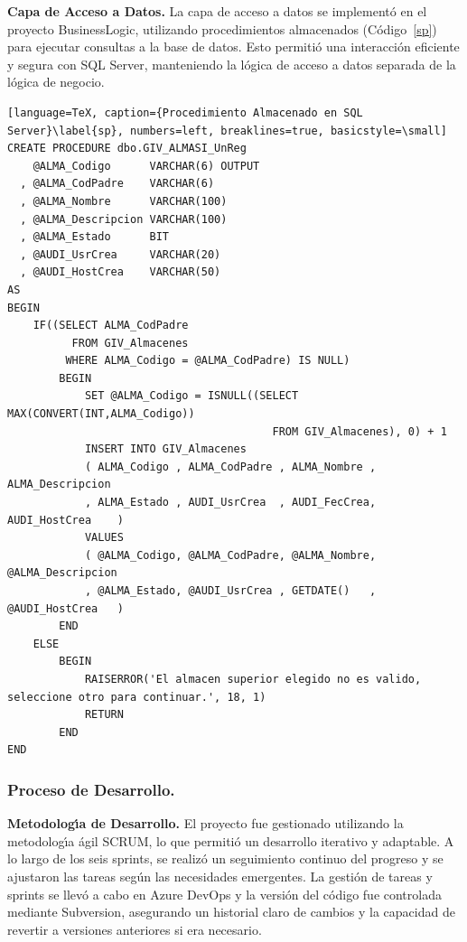 \documentclass[stu, 12pt, letterpaper, donotrepeattitle, floatsintext, natbib]{apa7}
\begin{document}
\textbf{Capa de Acceso a Datos. }La capa de acceso a datos se implement\'o en el proyecto BusinessLogic, utilizando procedimientos almacenados (C\'odigo~\ref{sp}) para ejecutar consultas a la base de datos. Esto permiti\'o una interacci\'on eficiente y segura con SQL Server, manteniendo la l\'ogica de acceso a datos separada de la l\'ogica de negocio.
\begin{lstlisting}[language=TeX, caption={Procedimiento Almacenado en SQL Server}\label{sp}, numbers=left, breaklines=true, basicstyle=\small]
CREATE PROCEDURE dbo.GIV_ALMASI_UnReg 
    @ALMA_Codigo      VARCHAR(6) OUTPUT
  , @ALMA_CodPadre    VARCHAR(6)
  , @ALMA_Nombre      VARCHAR(100)
  , @ALMA_Descripcion VARCHAR(100)
  , @ALMA_Estado      BIT
  , @AUDI_UsrCrea     VARCHAR(20)
  , @AUDI_HostCrea    VARCHAR(50)  
AS  
BEGIN
    IF((SELECT ALMA_CodPadre 
          FROM GIV_Almacenes  
         WHERE ALMA_Codigo = @ALMA_CodPadre) IS NULL)  
        BEGIN  
            SET @ALMA_Codigo = ISNULL((SELECT MAX(CONVERT(INT,ALMA_Codigo))  
                                         FROM GIV_Almacenes), 0) + 1
            INSERT INTO GIV_Almacenes  
            ( ALMA_Codigo , ALMA_CodPadre , ALMA_Nombre , ALMA_Descripcion     
            , ALMA_Estado , AUDI_UsrCrea  , AUDI_FecCrea, AUDI_HostCrea    )  
            VALUES  
            ( @ALMA_Codigo, @ALMA_CodPadre, @ALMA_Nombre, @ALMA_Descripcion     
            , @ALMA_Estado, @AUDI_UsrCrea , GETDATE()   , @AUDI_HostCrea   )  
        END
    ELSE  
        BEGIN  
            RAISERROR('El almacen superior elegido no es valido, seleccione otro para continuar.', 18, 1)  
            RETURN  
        END  
END
\end{lstlisting}
\subsubsection{Proceso de Desarrollo.}
\textbf{Metodolog\'{\i}a de Desarrollo. }El proyecto fue gestionado utilizando la metodolog\'{\i}a \'agil SCRUM, lo que permiti\'o un desarrollo iterativo y adaptable. A lo largo de los seis sprints, se realiz\'o un seguimiento continuo del progreso y se ajustaron las tareas seg\'un las necesidades emergentes. La gesti\'on de tareas y sprints se llev\'o a cabo en Azure DevOps y la versi\'on del c\'odigo fue controlada mediante Subversion, asegurando un historial claro de cambios y la capacidad de revertir a versiones anteriores si era necesario.
\end{document}
